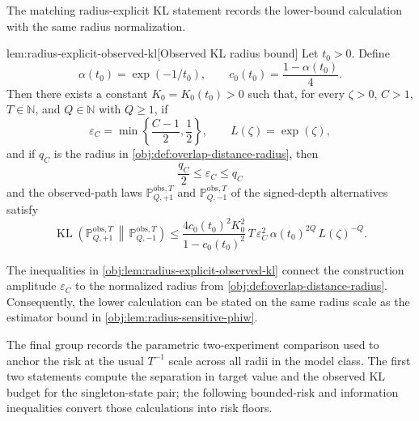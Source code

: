 The matching radius-explicit KL statement records the lower-bound calculation with the same radius normalization.

\begin{lemmav}{lem:radius-explicit-observed-kl}[Observed KL radius bound]
Let \(t_0>0\).  Define
\[
\alpha(t_0)=\exp(-1/t_0),\qquad
c_0(t_0)=\frac{1-\alpha(t_0)}{4}.
\]
Then there exists a constant \(K_0=K_0(t_0)>0\) such that, for every \(\zeta>0\), \(C>1\), \(T\in\mathbb N\), and \(Q\in\mathbb N\) with \(Q\ge1\), if
\[
\varepsilon_C=\min\left\{\frac{C-1}{2},\frac12\right\},\qquad
L(\zeta)=\exp(\zeta),
\]
and if \(q_C\) is the radius in \cref{obj:def:overlap-distance-radius}, then
\[
\frac{q_C}{2}\le \varepsilon_C \le q_C
\]
and the observed-path laws \(\mathbb P_{Q,+1}^{\mathrm{obs},T}\) and
\(\mathbb P_{Q,-1}^{\mathrm{obs},T}\) of the signed-depth alternatives satisfy
\[
\operatorname{KL}\!\left(
\mathbb P_{Q,+1}^{\mathrm{obs},T}\,\middle\|\,
\mathbb P_{Q,-1}^{\mathrm{obs},T}
\right)
\le
\frac{4c_0(t_0)^2K_0^2}{1-c_0(t_0)^2}\,
T\,\varepsilon_C^2\,\alpha(t_0)^{2Q}\,L(\zeta)^{-Q}.
\]
\end{lemmav}

The inequalities in \cref{obj:lem:radius-explicit-observed-kl} connect the construction amplitude \(\varepsilon_C\) to the normalized radius from \cref{obj:def:overlap-distance-radius}. Consequently, the lower calculation can be stated on the same radius scale as the estimator bound in \cref{obj:lem:radius-sensitive-phiw}.

The final group records the parametric two-experiment comparison used to anchor the risk at the usual \(T^{-1}\) scale across all radii in the model class. The first two statements compute the separation in target value and the observed KL budget for the singleton-state pair; the following bounded-risk and information inequalities convert those calculations into risk floors.

